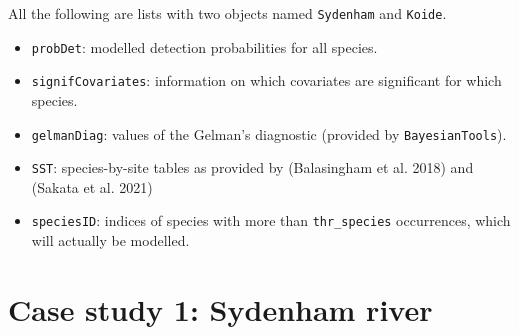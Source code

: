 \documentclass[
]{article}
\newenvironment{Shaded}{\begin{snugshade}}{\end{snugshade}}
\newcommand{\CommentTok}[1]{\textcolor[rgb]{0.56,0.35,0.01}{\textit{#1}}}
\newcommand{\DecValTok}[1]{\textcolor[rgb]{0.00,0.00,0.81}{#1}}
\newcommand{\FunctionTok}[1]{\textcolor[rgb]{0.13,0.29,0.53}{\textbf{#1}}}
\newcommand{\NormalTok}[1]{#1}
\newcommand{\OtherTok}[1]{\textcolor[rgb]{0.56,0.35,0.01}{#1}}
\newcommand{\SpecialCharTok}[1]{\textcolor[rgb]{0.81,0.36,0.00}{\textbf{#1}}}
\newcommand{\StringTok}[1]{\textcolor[rgb]{0.31,0.60,0.02}{#1}}
\providecommand{\tightlist}{%
  \setlength{\itemsep}{0pt}\setlength{\parskip}{0pt}}
\begin{document}
\begin{Shaded}
\end{Shaded}

All the following are lists with two objects named \texttt{Sydenham} and \texttt{Koide}.

\begin{itemize}
\tightlist
\item
  \texttt{probDet}: modelled detection probabilities for all species.
\item
  \texttt{signifCovariates}: information on which covariates are significant for which species.
\item
  \texttt{gelmanDiag}: values of the Gelman's diagnostic (provided by \texttt{BayesianTools}).
\item
  \texttt{SST}: species-by-site tables as provided by (Balasingham et al. 2018) and (Sakata et al. 2021)
\item
  \texttt{speciesID}: indices of species with more than \texttt{thr\_species} occurrences, which will actually be modelled.
\end{itemize}

\hypertarget{case-study-1-sydenham-river}{%
\section{Case study 1: Sydenham river}\label{case-study-1-sydenham-river}}
\end{document}
